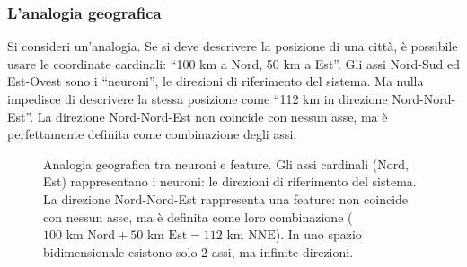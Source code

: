 \subsubsection{L'analogia geografica}
Si consideri un'analogia. Se si deve descrivere la posizione di una città, è possibile usare le coordinate cardinali: ``100 km a Nord, 50 km a Est''. Gli assi Nord-Sud ed Est-Ovest sono i ``neuroni'', le direzioni di riferimento del sistema. Ma nulla impedisce di descrivere la stessa posizione come ``112 km in direzione Nord-Nord-Est''. La direzione Nord-Nord-Est non coincide con nessun asse, ma è perfettamente definita come combinazione degli assi.
\begin{figure}[htbp]
    \centering
    \caption{Analogia geografica tra neuroni e feature. Gli assi cardinali (Nord, Est) rappresentano i neuroni: le direzioni di riferimento del sistema. La direzione Nord-Nord-Est rappresenta una feature: non coincide con nessun asse, ma è definita come loro combinazione ($100 \text{ km Nord} + 50 \text{ km Est} = 112 \text{ km NNE}$). In uno spazio bidimensionale esistono solo 2 assi, ma infinite direzioni.}
    \label{fig:geographic_analogy}
\end{figure}
